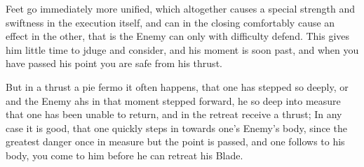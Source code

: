 \newpage


\newpage


Feet go immediately more unified, which altogether causes a special
strength and swiftness in the execution itself, and can in the closing
comfortably cause an effect in the other, that is the Enemy can only
with difficulty defend. This gives him little time to jduge and
consider, and his moment is soon past, and when you have passed his
point you are safe from his thrust.


But in a thrust a pie fermo it often happens, that one has stepped so
deeply, or and the Enemy ahs in that moment stepped forward, he so
deep into measure that one has been unable to return, and in the
retreat receive a thrust; In any case it is good, that one quickly
steps in towards one's Enemy's body, since the greatest danger once in
measure but the point is passed, and one follows to his body, you come
to him before he can retreat his Blade.


